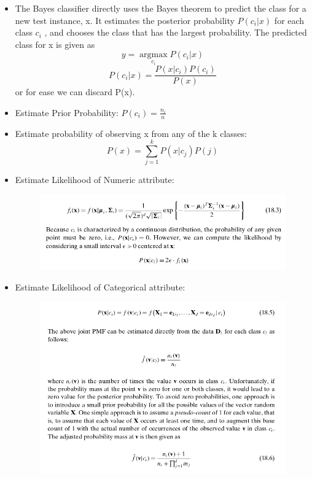 \begin{itemize}
    \item The Bayes classifier directly uses the Bayes theorem to predict the class for a new test instance, x. It estimates the posterior probability $P (c_i|x)$ for each class $c_i$ , and chooses the class that has the largest probability. The predicted class for x is given as
    \[ y = \operatorname*{argmax}_{c_i} P (c_i|x)\]
    \[ P (c_i|x) = \frac{P(x|c_i)P(c_i)}{P(x)}\]
    or for ease we can discard P(x).
    \item Estimate Prior Probability: $P(c_i) = \frac{n_i}{n}$
    \item Estimate probability of observing x from any of the k classes: $$P(x) = \sum_{j=1}^k{P(x|c_j)P(j)}$$
    \item Estimate Likelihood of Numeric attribute:
\begin{figure}[H]
\centerline{\includegraphics[width=1.3\textwidth]{Figures/bayes1.png}}
\end{figure}
    \item Estimate Likelihood of Categorical attribute:
\begin{figure}[H]
\centerline{\includegraphics[width=1.1\textwidth]{Figures/bayes2.png}}
\end{figure}  

\end{itemize}
